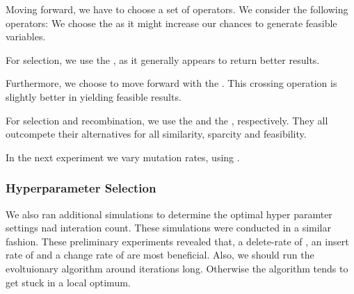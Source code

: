 \documentclass[./../../paper.tex]{subfiles}
\begin{document}
Moving forward, we have to choose a set of operators. We consider the following operators: We choose the  as it might increase our chances to generate feasible variables. 

For selection, we use the , as it generally appears to return better results. 

Furthermore, we choose to move forward with the . This crossing operation is slightly better in yielding feasible results. 

For selection and recombination, we use the  and the , respectively. They all outcompete their alternatives for all similarity, sparcity and feasibility.

In the next experiment we vary mutation rates, using \ModelEVOFSR. 


\subsubsection{Hyperparameter Selection}
We also ran additional simulations to determine the optimal hyper paramter settings nad interation count. These simulations were conducted in a similar fashion. These preliminary experiments revealed that, a delete-rate of , an insert rate of  and a change rate of  are most beneficial. Also, we should run the evoltuionary algorithm around  iterations long. Otherwise the algorithm tends to get stuck in a local optimum.
\end{document}
